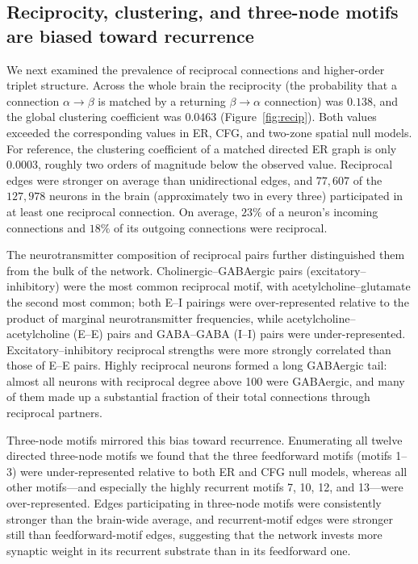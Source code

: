 \documentclass[11pt]{article}
\begin{document}
\subsection{Reciprocity, clustering, and three-node motifs are biased toward recurrence}

We next examined the prevalence of reciprocal connections and higher-order
triplet structure. Across the whole brain the reciprocity (the probability
that a connection $\alpha \to \beta$ is matched by a returning
$\beta \to \alpha$ connection) was $0.138$, and the global clustering
coefficient was $0.0463$ (Figure~\ref{fig:recip}). Both values exceeded
the corresponding values in ER, CFG, and two-zone spatial null models. For
reference, the clustering coefficient of a matched directed ER graph is
only $0.0003$, roughly two orders of magnitude below the observed value.
Reciprocal edges were stronger on average than unidirectional edges, and
$77{,}607$ of the $127{,}978$ neurons in the brain (approximately two in
every three) participated in at least one reciprocal connection. On
average, $23\%$ of a neuron's incoming connections and $18\%$ of its
outgoing connections were reciprocal.

The neurotransmitter composition of reciprocal pairs further distinguished
them from the bulk of the network. Cholinergic--GABAergic pairs
(excitatory--inhibitory) were the most common reciprocal motif, with
acetylcholine--glutamate the second most common; both E--I pairings were
over-represented relative to the product of marginal neurotransmitter
frequencies, while acetylcholine--acetylcholine (E--E) pairs and
GABA--GABA (I--I) pairs were under-represented. Excitatory--inhibitory
reciprocal strengths were more strongly correlated than those of E--E
pairs. Highly reciprocal neurons formed a long GABAergic tail: almost all
neurons with reciprocal degree above 100 were GABAergic, and many of them
made up a substantial fraction of their total connections through
reciprocal partners.

Three-node motifs mirrored this bias toward recurrence. Enumerating all
twelve directed three-node motifs we found that the three feedforward
motifs (motifs 1--3) were under-represented relative to both ER and CFG
null models, whereas all other motifs---and especially the highly
recurrent motifs 7, 10, 12, and 13---were over-represented. Edges
participating in three-node motifs were consistently stronger than the
brain-wide average, and recurrent-motif edges were stronger still than
feedforward-motif edges, suggesting that the network invests more synaptic
weight in its recurrent substrate than in its feedforward one.
\end{document}
